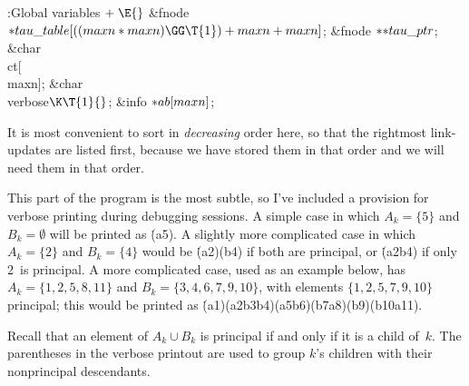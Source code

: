 \B{}:Global variables\X${}\mathrel+\E{}$\6
\&{fnode} ${}{*}\\{tau\_table}[((\\{maxn}*\\{maxn})\GG\T{1})+\\{maxn}+%
\\{maxn}]{}$;\6
\&{fnode} ${}{*}{*}\\{tau\_ptr}{}$;\6
\&{char} \\{ct}[\\{maxn}];\6
\&{char} \\{verbose}${}\K\T{1}{}$;\6
\&{info} ${}{*}\\{ab}[\\{maxn}]{}$;\par
\fi

It is most convenient to sort in {\it decreasing\/}
order here,
so that the rightmost link-updates are listed first, because we have
stored them in that order and we will need them in that order.

This part of the program is the most subtle, so I've included a
provision for verbose printing during debugging sessions.
A simple case in which $A_k=\{5\}$ and $B_k=\emptyset$ will be
printed as \.{(a5)}. A slightly more complicated case in which
$A_k=\{2\}$ and $B_k=\{4\}$ would be \.{(a2)(b4)} if both are
principal, or \.{(a2b4)} if only 2~is principal. A more complicated
case, used as an example below, has $A_k=\{1,2,5,8,11\}$ and
$B_k=\{3,4,6,7,9,10\}$, with elements $\{1,2,5,7,9,10\}$ principal;
this would be printed as \.{(a1)(a2b3b4)(a5b6)(b7a8)(b9)(b10a11)}.

Recall that an element  of $A_k\cup B_k$ is principal if and only if
it is a child of~$k$. The parentheses in the verbose printout
are used to group $k$'s children with their nonprincipal descendants.

